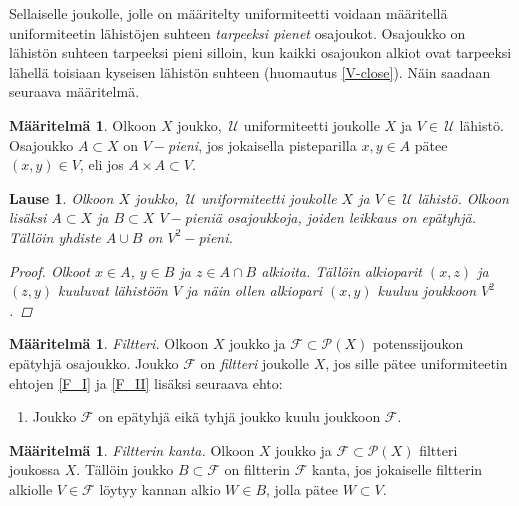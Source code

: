 \documentclass[12pt,a4paper,leqno]{report}
\newcommand{\U}{\,\mathcal{U}}
\newcommand{\Pot}{\mathcal{P}}
\newcommand{\F}{\mathcal{F}}
\theoremstyle{plain}
\newtheorem{lause}[equation]{Lause}
\theoremstyle{definition}
\newtheorem{maar}[equation]{Määritelmä}
\theoremstyle{remark}
\begin{document}
Sellaiselle joukolle, jolle on määritelty uniformiteetti voidaan määritellä 
uniformiteetin lähistöjen suhteen \emph{tarpeeksi pienet} osa\-jou\-kot. 
Osajoukko on lähistön suhteen tarpeeksi pieni silloin, 
kun kaikki osajoukon alkiot ovat 
tarpeeksi lähellä toisiaan kyseisen lähistön suhteen (huomautus \ref{V-close}). 
Näin saadaan seuraava määritelmä.
\begin{maar}
Olkoon $X$ joukko, $\U$ uniformiteetti joukolle $X$ ja $V\in\U$ lähistö. 
Osajoukko $A\subset X$ on \emph{$V-$pieni}, jos 
jokaisella pisteparilla $x,y\in A$ pätee $(x,y)\in V$, eli jos $A\times A\subset V$.
\end{maar}
\begin{lause}
Olkoon $X$ joukko, $\U$ uniformiteetti joukolle $X$ ja $V\in\U$ lähistö. 
Olkoon lisäksi $A\subset X$ ja $B\subset X$ $V-$pieniä osajoukkoja, 
joiden leikkaus on epätyhjä. 
Tällöin yhdiste $A\cup B$ on $V^2-$pieni.
\begin{proof}
Olkoot $x\in A$, $y\in B$ ja $z\in A\cap B$ alkioita. 
Tällöin alkioparit $(x,z)$ ja $(z,y)$ kuuluvat lähistöön $V$ 
ja näin ollen alkiopari $(x,y)$ kuuluu joukkoon $V^2$.
\end{proof}
\end{lause}
\begin{maar}\label{filtteri_maar}
\emph{Filtteri.} Olkoon $X$ joukko ja $\F\subset \Pot(X)$ potenssijoukon epätyhjä osa\-joukko. 
Joukko $\F$ on \emph{filtteri} joukolle $X$, jos sille pätee 
uniformiteetin ehtojen \ref{F_I} ja \ref{F_II} lisäksi 
seuraava ehto:
\begin{enumerate} [label=(F),ref=(F)]
\item\label{filtteriehto} Joukko $\F$ on epätyhjä eikä tyhjä joukko kuulu joukkoon $\F$.
\end{enumerate} 
\end{maar}
\begin{maar}
\emph{Filtterin kanta.} 
Olkoon $X$ joukko ja $\F\subset \Pot(X)$ filtteri joukossa $X$. 
Tällöin joukko $B\subset \F$ on filtterin $\F$ kanta, 
jos jokaiselle filtterin alkiolle $V\in \F$ 
löytyy kannan alkio $W\in B $, jolla pätee $W\subset V$.
\end{maar}
\end{document}
